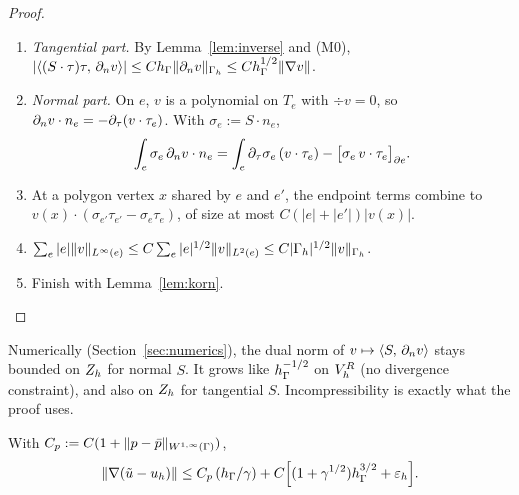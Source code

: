 \begin{proof}
\begin{enumerate}
\item \emph{Tangential part.} By Lemma~\ref{lem:inverse} and (M0), $|\langle (S\cdot\tau)\tau,\, \partial_n v\rangle|\le Ch_\Gamma\lVert \partial_n v\rVert_{\Gamma_h}\le Ch_\Gamma^{1/2}\lVert \nabla v\rVert$.
\item \emph{Normal part.} On $e$, $v$ is a polynomial on $T_e$ with $\div v=0$, so $\partial_n v\cdot n_e=-\partial_\tau(v\cdot\tau_e)$. With $\sigma_e:=S\cdot n_e$,
\[
\int_e\sigma_e\,\partial_n v\cdot n_e=\int_e\partial_\tau\sigma_e\,(v\cdot\tau_e)-\bigl[\sigma_e\,v\cdot\tau_e\bigr]_{\partial e}.
\]
\item At a polygon vertex $x$ shared by $e$ and $e'$, the endpoint terms combine to $v(x)\cdot(\sigma_{e'}\tau_{e'}-\sigma_e\tau_e)$, of size at most $C(|e|+|e'|)|v(x)|$.
\item $\sum_e|e|\lVert v\rVert_{L^\infty(e)}\le C\sum_e|e|^{1/2}\lVert v\rVert_{L^2(e)}\le C|\Gamma_h|^{1/2}\lVert v\rVert_{\Gamma_h}$.
\item Finish with Lemma~\ref{lem:korn}.\qedhere
\end{enumerate}
\end{proof}

Numerically (Section~\ref{sec:numerics}), the dual norm of $v\mapsto\langle S,\, \partial_n v\rangle$ stays bounded on $Z_h$ for normal $S$. It grows like $h_\Gamma^{-1/2}$ on $V_h^R$ (no divergence constraint), and also on $Z_h$ for tangential $S$. Incompressibility is exactly what the proof uses.

\begin{theorem}\label{thm:C}
With $C_p:=C(1+\lVert p-\bar p\rVert_{W^{1,\infty}(\Gamma)})$,
\[
\lVert \nabla(\tilde u-u_h)\rVert\le C_p\,(h_\Gamma/\gamma)+C\Bigl[(1+\gamma^{1/2})h_\Gamma^{3/2}+\varepsilon_h\Bigr].
\]
\end{theorem}


